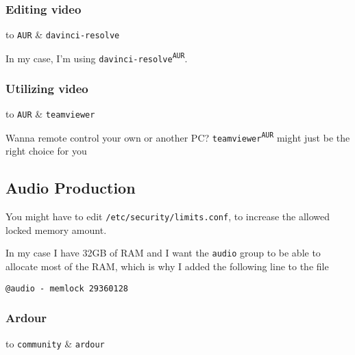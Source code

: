 \documentclass[9pt]{report}
\newenvironment{packagetable}
{\begin{longtabu}to \textwidth [b]{X[1,r]|X[1,l]}}
{\end{longtabu}}
\begin{document}
\newpage

\hypertarget{x-editing-video}{\subsubsection{Editing video}}
\begin{packagetable}
    \texttt{AUR} & \texttt{davinci-resolve} \\ 
\end{packagetable}

In my case, I’m using \texttt{davinci-resolve\textsuperscript{\texttt{AUR}}}.



\newpage

\hypertarget{x-utilizing-video}{\subsubsection{Utilizing video}}
\begin{packagetable}
    \texttt{AUR} & \texttt{teamviewer} \\ 
\end{packagetable}

Wanna remote control your own or another PC?
\texttt{teamviewer\textsuperscript{\texttt{AUR}}} might just be the right choice for you



\newpage

\hypertarget{x-audio-production}{\subsection{Audio Production}}
You might have to edit \texttt{/etc/security/limits.conf}, to increase the allowed locked memory amount.


In my case I have 32GB of RAM and I want the \texttt{audio} group to be able to allocate most of the RAM, which is why I added the following line to the file


\begin{verbatim}
@audio - memlock 29360128
\end{verbatim}

\hypertarget{x-ardour}{\subsubsection{Ardour}}
\begin{packagetable}
    \texttt{community} & \texttt{ardour} \\ 
\end{packagetable}
\end{document}
